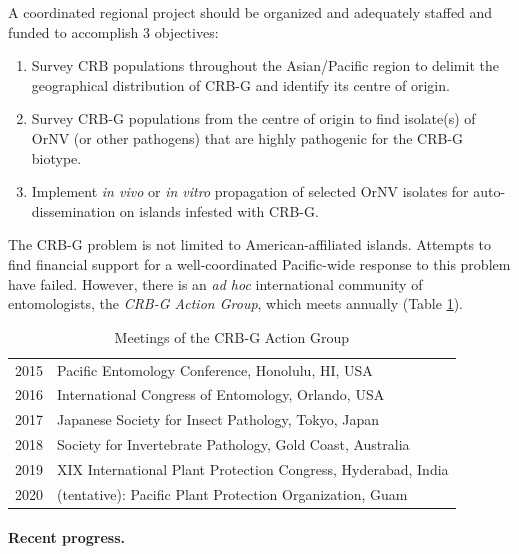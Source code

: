 \documentclass[12pt,letterpaper,english,bibliography=totocnumbered, abstract=on]{scrartcl}
\begin{document}
A coordinated regional project should be organized and adequately
staffed and funded to accomplish 3 objectives:

\begin{enumerate}
	
\item Survey CRB populations throughout the Asian/Pacific region to delimit
the geographical distribution of CRB-G and identify its centre of
origin.

\item Survey CRB-G populations from the centre of origin to find isolate(s)
of OrNV (or other pathogens) that are highly pathogenic for the CRB-G
biotype.

\item Implement \emph{in vivo} or \emph{in vitro} propagation of selected
OrNV isolates for auto-dissemination on islands infested with CRB-G.

\end{enumerate}

The CRB-G problem is not limited to American-affiliated islands. Attempts to find financial support for a well-coordinated Pacific-wide response to this problem have failed. However, there is an \textit{ad hoc} international community of entomologists, the \textit{CRB-G Action Group}, which meets annually (Table \ref{table meetings}).

\begin{table}[H]
	\label{table meetings}
	\centering
	\caption{Meetings of the CRB-G Action Group}
	\begin{tabular}{ll}
		\hline 
		2015 & Pacific Entomology Conference, Honolulu, HI, USA \\ 
		2016 & International Congress of Entomology, Orlando, USA \\
		2017 & Japanese Society for Insect Pathology, Tokyo, Japan \\
		2018 & Society for Invertebrate Pathology, Gold Coast, Australia \\
		2019 & XIX International Plant Protection Congress, Hyderabad, India \\
		2020 & (tentative): Pacific Plant Protection Organization, Guam \\ 
		\hline
\end{tabular}
\end{table}






\paragraph{Recent progress.}
\label{recent progress}
\end{document}
